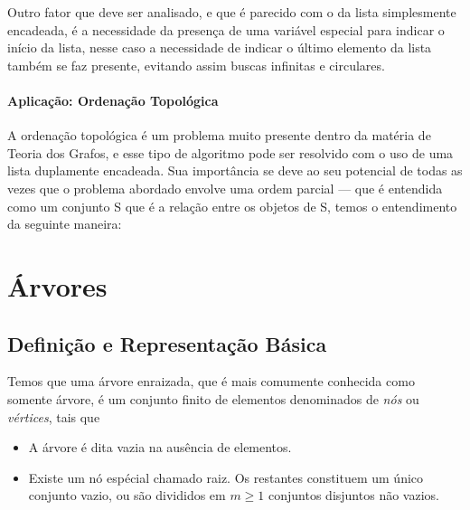 \documentclass[12pt, a4paper]{paper}
\begin{document}
    Outro fator que deve ser analisado, e que é parecido com o da lista simplesmente 
    encadeada, é a necessidade da presença de uma variável especial para indicar o 
    início da lista, nesse caso a necessidade de indicar o último elemento da lista 
    também se faz presente, evitando assim buscas infinitas e circulares.
    
    \paragraph{Aplicação: Ordenação Topológica} %
    \label{par:Aplicação: Ordenação Topológica}
    A ordenação topológica é um problema muito presente dentro da matéria de Teoria 
    dos Grafos, e esse tipo de algoritmo pode ser resolvido com o uso de uma lista 
    duplamente encadeada. Sua importância se deve ao seu potencial de todas as vezes 
    que o problema abordado envolve uma ordem parcial --- que é entendida como um 
    conjunto S que é a relação entre os objetos de S, temos o entendimento da seguinte
    maneira:

    

\section{Árvores} %
\label{sec:Árvores}
\subsection{Definição e Representação Básica} %
\label{sub:Definição e Representação Básica}
Temos que uma árvore enraizada, que é mais comumente conhecida como somente árvore, 
é um conjunto finito de elementos denominados de \textit{nós} ou \textit{vértices}, tais
que 
\begin{itemize}
  \item A árvore é dita vazia na ausência de elementos.
  \item Existe um nó espécial chamado raiz. Os restantes constituem um único conjunto vazio, ou são divididos em $m \geq 1$ conjuntos disjuntos não vazios.

\end{itemize}









\end{document}

